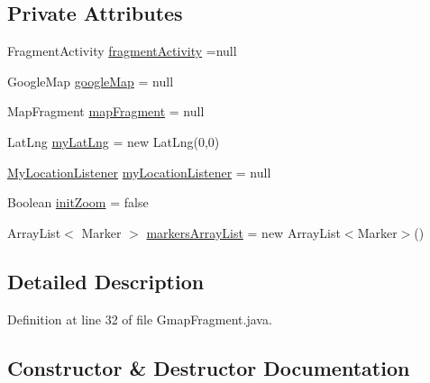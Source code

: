 \subsection*{Private Attributes}
\begin{DoxyCompactItemize}
\item 
Fragment\+Activity \hyperlink{classpt_1_1lsts_1_1asa_1_1fragments_1_1GmapFragment_a53da1ea1f7df545a178174db9401a07e}{fragment\+Activity} =null
\item 
Google\+Map \hyperlink{classpt_1_1lsts_1_1asa_1_1fragments_1_1GmapFragment_a4fda85fb2f7c977b51c476e6ddd2951f}{google\+Map} = null
\item 
Map\+Fragment \hyperlink{classpt_1_1lsts_1_1asa_1_1fragments_1_1GmapFragment_ad69a1fb296f59670076853cbfc6703cf}{map\+Fragment} = null
\item 
Lat\+Lng \hyperlink{classpt_1_1lsts_1_1asa_1_1fragments_1_1GmapFragment_a5517306dfa5a0e06c006abb9b5dd908d}{my\+Lat\+Lng} = new Lat\+Lng(0,0)
\item 
\hyperlink{classpt_1_1lsts_1_1asa_1_1listenners_1_1MyLocationListener}{My\+Location\+Listener} \hyperlink{classpt_1_1lsts_1_1asa_1_1fragments_1_1GmapFragment_acebab14aaa9af771ab13b151d8576ef9}{my\+Location\+Listener} = null
\item 
Boolean \hyperlink{classpt_1_1lsts_1_1asa_1_1fragments_1_1GmapFragment_a91796464e380fcd7dacfe95fa2d19883}{init\+Zoom} = false
\item 
Array\+List$<$ Marker $>$ \hyperlink{classpt_1_1lsts_1_1asa_1_1fragments_1_1GmapFragment_a072003d0c8ba99401be861ddfd19f31a}{markers\+Array\+List} = new Array\+List$<$Marker$>$()
\end{DoxyCompactItemize}


\subsection{Detailed Description}


Definition at line 32 of file Gmap\+Fragment.\+java.



\subsection{Constructor \& Destructor Documentation}
\hypertarget{classpt_1_1lsts_1_1asa_1_1fragments_1_1GmapFragment_abba08e56a03203f0e2a706bea0fdaa7e}{}
